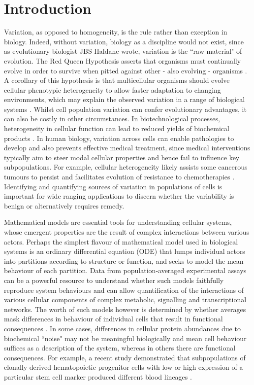 \section{Introduction}
Variation, as opposed to homogeneity, is the rule rather than exception in biology. Indeed, without variation, biology as a discipline would not exist, since as evolutionary biologist JBS Haldane wrote, variation is the ``raw material" of evolution. The Red Queen Hypothesis asserts that organisms must continually evolve in order to survive when pitted against other - also evolving - organisms \cite{ridley1994red}. A corollary of this hypothesis is that multicellular organisms should evolve cellular phenotypic heterogeneity to allow faster adaptation to changing environments, which may explain the observed variation in a range of biological systems \cite{fraser2009chance}. Whilst cell population variation can confer evolutionary advantages, it can also be costly in other circumstances. In biotechnological processes, heterogeneity in cellular function can lead to reduced yields of biochemical products \cite{delvigne2014metabolic}. In human biology, variation across cells can enable pathologies to develop and also prevents effective medical treatment, since medical interventions typically aim to steer modal cellular properties and hence fail to influence key subpopulations. For example, cellular heterogeneity likely assists some cancerous tumours to persist \cite{gatenby2007cellular} and facilitates evolution of resistance to chemotherapies \cite{altrock2015mathematics}. Identifying and quantifying sources of variation in populations of cells is important for wide ranging applications to discern whether the variability is benign or alternatively requires remedy.

Mathematical models are essential tools for understanding cellular systems, whose emergent properties are the result of complex interactions between various actors. Perhaps the simplest flavour of mathematical model used in biological systems is an ordinary differential equation (ODE) that lumps individual actors into partitions according to structure or function, and seeks to model the mean behaviour of each partition. Data from population-averaged experimental assays can be a powerful resource to understand whether such models faithfully reproduce system behaviours and can allow quantification of the interactions of various cellular components of complex metabolic, signalling and transcriptional networks. The worth of such models however is determined by whether averages mask differences in behaviour of individual cells that result in functional consequences \cite{altschuler2010cellular}. In some cases, differences in cellular protein abundances due to biochemical ``noise" may not be meaningful biologically \cite{elowitz2002stochastic} and mean cell behaviour suffices as a description of the system, whereas in others there are functional consequences. For example, a recent study demonstrated that subpopulations of clonally derived hematopoietic progenitor cells with low or high expression of a particular stem cell marker produced different blood lineages \cite{chang2008transcriptome}.

